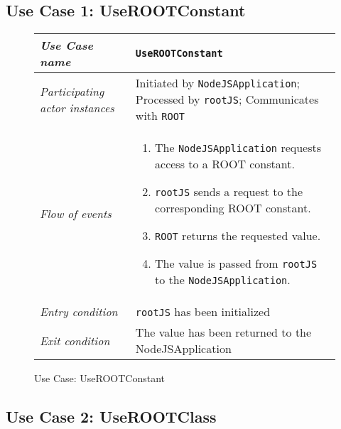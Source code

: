 \subsection{Use Case 1: UseROOTConstant}

\begin{figure}[htb]
	\centering
	\begin{longtable}{p{3cm} @{\hskip 1cm} p{12cm}}
		\hline
		
		\textit{Use Case name} & \texttt{UseROOTConstant}\\
		\hline
		
		\textit{Participating actor instances} & Initiated by \texttt{NodeJSApplication}; Processed by \texttt{rootJS}; Communicates with \texttt{ROOT}\\
		\hline
		
		\textit{Flow of events} &
			\begin{enumerate}
				\item The \texttt{NodeJSApplication} requests access to a ROOT constant.
				\item \texttt{rootJS} sends a request to the corresponding ROOT constant.
				\item \texttt{ROOT} returns the requested value.
	                        \item The value is passed from \texttt{rootJS} to the \texttt{NodeJSApplication}.
			\end{enumerate}
			\\
		\hline
		
		\textit{Entry condition} & \texttt{rootJS} has been initialized\\
		\hline
		
		\textit{Exit condition} & The value has been returned to the NodeJSApplication\\
        \hline
	\end{longtable}
	
	\caption{Use Case: UseROOTConstant}
\end{figure}
\pagebreak
\subsection{Use Case 2: UseROOTClass}


